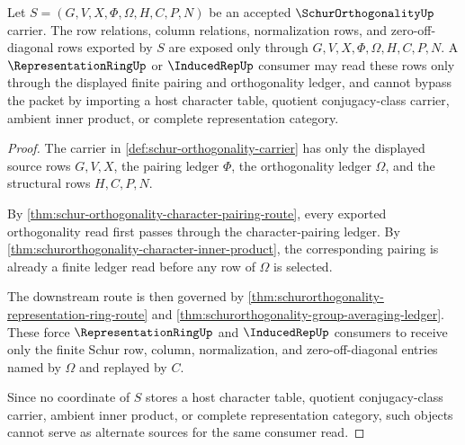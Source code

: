 \begin{theorem}
\label{thm:schurorthogonality-row-column-orthogonality-ledger}
Let $S=(G,V,X,\Phi,\Omega,H,C,P,N)$ be an accepted $\SchurOrthogonalityUp$ carrier. The row relations, column relations, normalization rows, and zero-off-diagonal rows exported by $S$ are exposed only through $G,V,X,\Phi,\Omega,H,C,P,N$. A $\RepresentationRingUp$ or $\InducedRepUp$ consumer may read these rows only through the displayed finite pairing and orthogonality ledger, and cannot bypass the packet by importing a host character table, quotient conjugacy-class carrier, ambient inner product, or complete representation category.
\end{theorem}
\begin{proof}
The carrier in \autoref{def:schur-orthogonality-carrier} has only the displayed source rows $G,V,X$, the pairing ledger $\Phi$, the orthogonality ledger $\Omega$, and the structural rows $H,C,P,N$.

By \autoref{thm:schur-orthogonality-character-pairing-route}, every exported orthogonality read first passes through the character-pairing ledger. By \autoref{thm:schurorthogonality-character-inner-product}, the corresponding pairing is already a finite ledger read before any row of $\Omega$ is selected.

The downstream route is then governed by \autoref{thm:schurorthogonality-representation-ring-route} and \autoref{thm:schurorthogonality-group-averaging-ledger}. These force $\RepresentationRingUp$ and $\InducedRepUp$ consumers to receive only the finite Schur row, column, normalization, and zero-off-diagonal entries named by $\Omega$ and replayed by $C$.

Since no coordinate of $S$ stores a host character table, quotient conjugacy-class carrier, ambient inner product, or complete representation category, such objects cannot serve as alternate sources for the same consumer read.
\end{proof}

